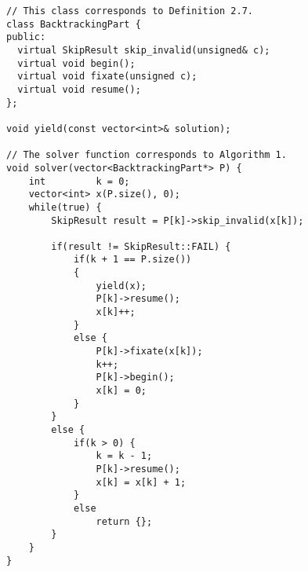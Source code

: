 \begin{lstlisting}[language=MyCpp,
                   label={cppsolver},caption=
  {Complete C++ implementation of \Cref{backtrackalg}:
    The if-else statements in lines 19--41 precisely correspond to those
    in lines 5--17 of that algorithm.
    The \texttt{BacktrackingPart} objects iterate over $\protect{B_k[C](M,x)}$ via the
    \texttt{skip\_invalid} method.
    The remaining member function calls in lines
    $\text{23},\text{27},\text{29},\text{36}$ precompute structures that are
    used in \texttt{skip\_invalid} for quick evaluation.}]
// This class corresponds to Definition 2.7.
class BacktrackingPart {
public:
  virtual SkipResult skip_invalid(unsigned& c);
  virtual void begin();
  virtual void fixate(unsigned c);
  virtual void resume();
};

void yield(const vector<int>& solution);

// The solver function corresponds to Algorithm 1.
void solver(vector<BacktrackingPart*> P) {
    int         k = 0;
    vector<int> x(P.size(), 0);
    while(true) {
        SkipResult result = P[k]->skip_invalid(x[k]);

        if(result != SkipResult::FAIL) {
            if(k + 1 == P.size())
            {
                yield(x);
                P[k]->resume();
                x[k]++;
            }
            else {
                P[k]->fixate(x[k]);
                k++;
                P[k]->begin();
                x[k] = 0;
            }
        }
        else {
            if(k > 0) {
                k = k - 1;
                P[k]->resume();
                x[k] = x[k] + 1;
            }
            else
                return {};
        }
    }
}
\end{lstlisting}
